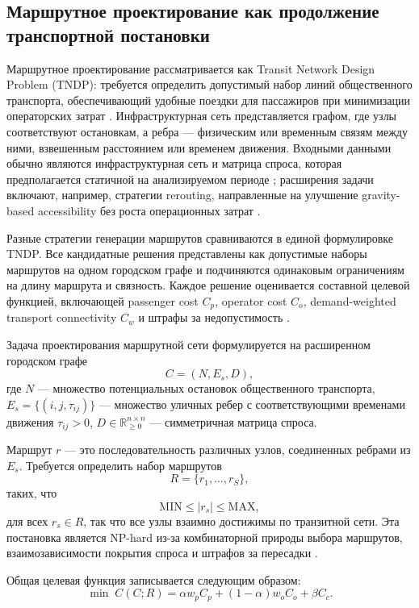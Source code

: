 \subsection{Маршрутное проектирование как продолжение транспортной постановки}
\label{subsec:chapter3-morozov}

Маршрутное проектирование рассматривается как Transit Network Design Problem (TNDP): требуется определить допустимый набор линий общественного транспорта, обеспечивающий удобные поездки для пассажиров при минимизации операторских затрат \cite{mandl1980tndp,duranMicco2022tndpReview,sahin2023linePlanning,morozov2026oneRuleTndp}. Инфраструктурная сеть представляется графом, где узлы соответствуют остановкам, а ребра --- физическим или временным связям между ними, взвешенным расстоянием или временем движения. Входными данными обычно являются инфраструктурная сеть и матрица спроса, которая предполагается статичной на анализируемом периоде \cite{schmidt2024linePlanning}; расширения задачи включают, например, стратегии rerouting, направленные на улучшение gravity-based accessibility без роста операционных затрат \cite{rumpf2021reroutingAccessibility}.

Разные стратегии генерации маршрутов сравниваются в единой формулировке TNDP. Все кандидатные решения представлены как допустимые наборы маршрутов на одном городском графе и подчиняются одинаковым ограничениям на длину маршрута и связность. Каждое решение оценивается составной целевой функцией, включающей passenger cost \(C_p\), operator cost \(C_o\), demand-weighted transport connectivity \(C_w\) и штрафы за недопустимость \cite{morozov2026oneRuleTndp}.

Задача проектирования маршрутной сети формулируется на расширенном городском графе
\[
C = (N, E_s, D),
\]
где $N$ --- множество потенциальных остановок общественного транспорта,
$E_s=\{(i,j,\tau_{ij})\}$ --- множество уличных ребер с соответствующими временами движения $\tau_{ij}>0$,
$D\in\mathbb{R}_{\ge 0}^{n\times n}$ --- симметричная матрица спроса.

Маршрут $r$ --- это последовательность различных узлов, соединенных ребрами из $E_s$.
Требуется определить набор маршрутов
\[
R = \{r_1,\dots,r_S\},
\]
таких, что
\[
\mathrm{MIN} \le |r_s| \le \mathrm{MAX},
\]
для всех $r_s\in R$, так что все узлы взаимно достижимы по транзитной сети. Эта постановка является NP-hard из-за комбинаторной природы выбора маршрутов, взаимозависимости покрытия спроса и штрафов за пересадки \cite{morozov2026oneRuleTndp}.

Общая целевая функция записывается следующим образом:
\[
\min \; C(C;R)=\alpha w_p C_p + (1-\alpha) w_o C_o + \beta C_c.
\]

